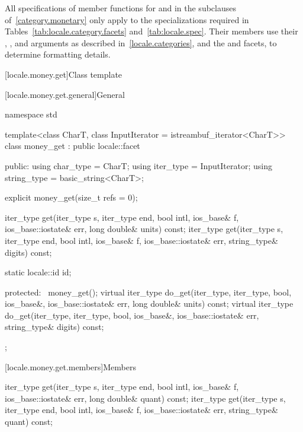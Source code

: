 \pnum
All specifications of member functions
for  and 
in the subclauses of~\ref{category.monetary} only apply to
the specializations required in Tables~\ref{tab:locale.category.facets}
and~\ref{tab:locale.spec}.
Their members use their , ,
and  arguments as described in~\ref{locale.categories}, and
the  and  facets,
to determine formatting details.

[locale.money.get]{Class template }

[locale.money.get.general]{General}

%
\begin{codeblock}
namespace std {
  template<class CharT, class InputIterator = istreambuf_iterator<CharT>>
    class money_get : public locale::facet {
    public:
      using char_type   = CharT;
      using iter_type   = InputIterator;
      using string_type = basic_string<CharT>;

      explicit money_get(size_t refs = 0);

      iter_type get(iter_type s, iter_type end, bool intl,
                    ios_base& f, ios_base::iostate& err,
                    long double& units) const;
      iter_type get(iter_type s, iter_type end, bool intl,
                    ios_base& f, ios_base::iostate& err,
                    string_type& digits) const;

      static locale::id id;

    protected:
      ~money_get();
      virtual iter_type do_get(iter_type, iter_type, bool, ios_base&,
                               ios_base::iostate& err, long double& units) const;
      virtual iter_type do_get(iter_type, iter_type, bool, ios_base&,
                               ios_base::iostate& err, string_type& digits) const;
    };
}
\end{codeblock}

[locale.money.get.members]{Members}

%
\begin{itemdecl}
iter_type get(iter_type s, iter_type end, bool intl, ios_base& f,
              ios_base::iostate& err, long double& quant) const;
iter_type get(iter_type s, iter_type end, bool intl, ios_base& f,
              ios_base::iostate& err, string_type& quant) const;
\end{itemdecl}

